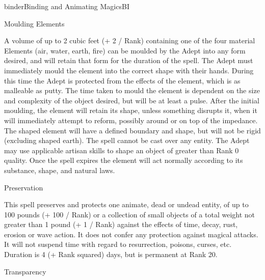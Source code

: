 \begin{college}[1.1]{binder}{Binding and Animating Magics}{BI}
\begin{spell}[G-8]{Moulding Elements}

\begin{effects}
A volume of up to 2 cubic feet (+ 2 / Rank) containing one of the four
material Elements (air, water, earth, fire) can be moulded by the
Adept into any form desired, and will retain that form for the
duration of the spell. The Adept must immediately mould the element
into the correct shape with their hands. During this time the Adept is
protected from the effects of the element, which is as malleable as
putty. The time taken to mould the element is dependent on the size
and complexity of the object desired, but will be at least a
pulse. After the initial moulding, the element will retain its shape,
unless something disrupts it, when it will immediately attempt to
reform, possibly around or on top of the impedance. The shaped element
will have a defined boundary and shape, but will not be rigid
(excluding shaped earth). The spell cannot be cast over any
entity. The Adept may use applicable artisan skills to shape an object
of greater than Rank 0 quality. Once the spell expires the element
will act normally according to its substance, shape, and natural laws.
\end{effects}
\end{spell}

\begin{spell}[G-9]{Preservation}

\begin{effects}
This spell preserves and protects one animate, dead or undead entity,
of up to 100 pounds (+ 100 / Rank) or a collection of small objects of
a total weight not greater than 1 pound (+ 1 / Rank) against the
effects of time, decay, rust, erosion or wave action. It does not
confer any protection against magical attacks. It will not suspend
time with regard to resurrection, poisons, curses, etc. Duration is 4
(+ Rank squared) days, but is permanent at Rank 20.
\end{effects}
\end{spell}

\begin{spell}[G-10]{Transparency}


\end{spell}
\end{college}
